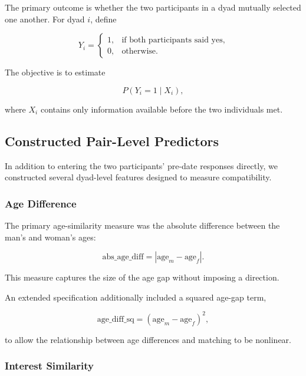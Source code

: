 \documentclass[11pt,letterpaper,reqno]{amsart}
\numberwithin{equation}{subsection}
\theoremstyle{definition}
\numberwithin{thm}{subsection}
\begin{document}
The primary outcome is whether the two participants in a dyad mutually selected one another. For dyad $i$, define

\begin{equation}
Y_i =
\begin{cases}
1, & \text{if both participants said yes},\\
0, & \text{otherwise}.
\end{cases}
\end{equation}

The objective is to estimate

\begin{equation}
P(Y_i = 1 \mid X_i),
\end{equation}

where $X_i$ contains only information available before the two individuals met.

\subsection{Constructed Pair-Level Predictors}
\label{constructed_vars}

In addition to entering the two participants' pre-date responses directly, we constructed several dyad-level features designed to measure compatibility.

\subsubsection{Age Difference}

The primary age-similarity measure was the absolute difference between the man's and woman's ages:

\begin{equation}
\text{abs\_age\_diff}
=
\left|
\text{age}_{m}
-
\text{age}_{f}
\right|.
\end{equation}

This measure captures the size of the age gap without imposing a direction.

An extended specification additionally included a squared age-gap term,

\begin{equation}
\text{age\_diff\_sq}
=
\left(
\text{age}_{m}
-
\text{age}_{f}
\right)^2,
\end{equation}

to allow the relationship between age differences and matching to be nonlinear.

\subsubsection{Interest Similarity}
\end{document}
